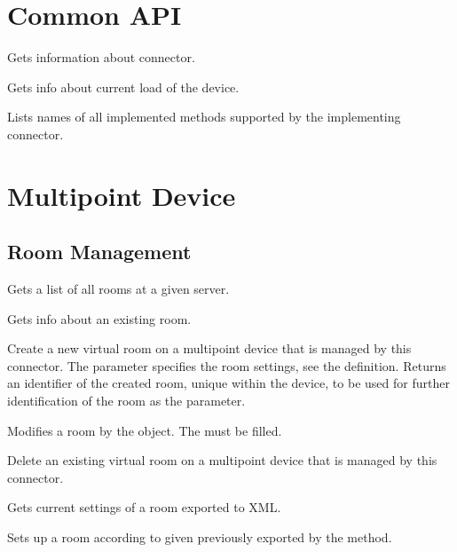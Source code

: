 \section{Common API}

\begin{Api}

Gets information about connector.

Gets info about current load of the device.

Lists names of all implemented methods supported by the implementing connector.

\end{Api}

\section{Multipoint Device} \label{sect:connector-api-multipoint}

\subsection{Room Management}
\begin{Api}

Gets a list of all rooms at a given server.

Gets info about an existing room.

Create a new virtual room on a multipoint device that is managed by this connector. The  parameter specifies the room settings, see the  definition. Returns an identifier of the created room, unique within the device, to be used for further identification of the room as the  parameter.

Modifies a room by the  object. The  must be filled.

Delete an existing virtual room on a multipoint device that is managed by this connector.

Gets current settings of a room exported to XML.
\\

Sets up a room according to given  previously exported by the  method.

\end{Api}


